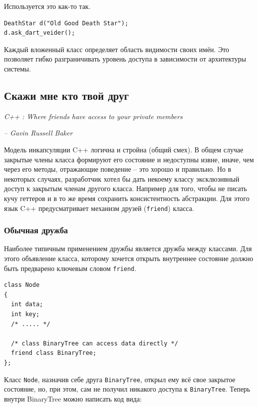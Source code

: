\documentclass[a4paper,12pt,oneside]{article}
\begin{document}
Используется это как-то так.

\begin{lstlisting}
DeathStar d("Old Good Death Star");
d.ask_dart_veider();
\end{lstlisting}

Каждый вложенный класс определяет область видимости своих имён. Это позволяет гибко разграничивать уровень доступа в зависимости от архитектуры системы.

\pagebreak
\subsection{Скажи мне кто твой друг}\label{WhosYourFriend}

\hfill\textit{C++ : Where friends have access to your private members}{\vspace{0.5em}}

\hfill\textit{-- Gavin Russell Baker}

Модель инкапсуляции C++ логична и стройна (общий смех). В общем случае закрытые члены класса формируют его состояние и недоступны извне, иначе, чем через его методы, отражающие поведение -- это хорошо и правильно. Но в некоторых случаях, разработчик хотел бы дать некоему классу эксклюзивный доступ к закрытым членам другого класса. Например для того, чтобы не писать кучу геттеров и в то же время сохранить консистентность абстракции. Для этого язык C++ предусматривает механизм друзей (\lstinline!friend!) класса.

\subsubsection{Обычная дружба}

Наиболее типичным применением дружбы является дружба между классами. Для этого объявление класса, которому хочется открыть внутреннее состояние должно быть предварено ключевым словом \lstinline!friend!.

\begin{lstlisting}
class Node
{
  int data;
  int key;
  /* ..... */

  /* class BinaryTree can access data directly */
  friend class BinaryTree; 
};
\end{lstlisting}


Класс \lstinline!Node!, назначив себе друга \lstinline!BinaryTree!, открыл ему всё свое закрытое состояние, но, при этом, сам не получил никакого доступа к \lstinline!BinaryTree!. Теперь внутри BinaryTree можно написать код вида:
\end{document}

